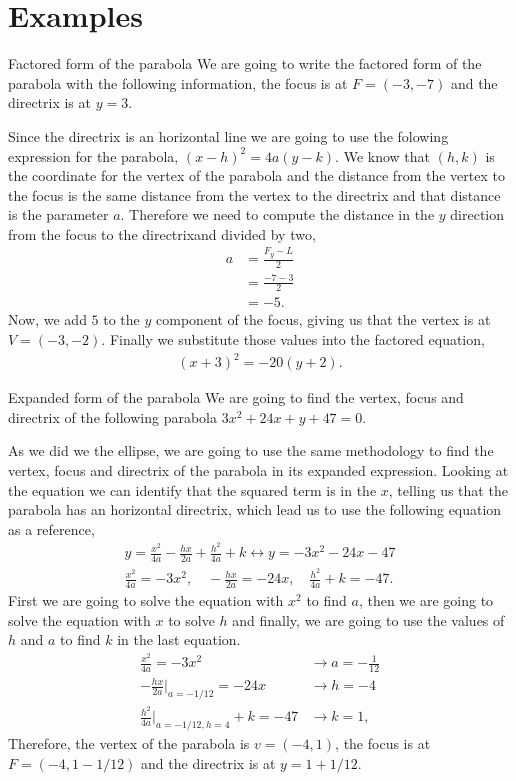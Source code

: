 \documentclass[../main-exe.tex]{subfiles}
\begin{document}
\section{Examples}

\begin{example}{Factored form of the parabola}{}
We are going to write the factored form of the parabola with the following information, the focus is at $F=(-3,-7)$ and the directrix is at $y=3$.

Since the directrix is an horizontal line we are going to use the folowing expression for the parabola, $(x-h)^2=4a(y-k)$.
We know that $(h,k)$ is the coordinate for the vertex of the parabola and the distance from the vertex to the focus is the same distance from the vertex to the directrix and that distance is the parameter $a$.
Therefore we need to compute the distance in the $y$ direction from the focus to the directrixand divided by two,
\begin{align*}
    a &= \frac{F_y - L}{2} \\
      &= \frac{-7-3}{2} \\
      &= -5.
\end{align*}
Now, we add $5$ to the $y$ component of the focus, giving us that the vertex is at $V=(-3,-2)$.
Finally we substitute those values into the factored equation,
\begin{gather*}
    (x+3)^2=-20(y+2).
\end{gather*}

\end{example}

\begin{example}{Expanded form of the parabola}{}
We are going to find the vertex, focus and directrix of the following parabola $3x^2+24x+y+47=0$.

As we did we the ellipse, we are going to use the same methodology to find the vertex, focus and directrix of the parabola in its expanded expression.
Looking at the equation we can identify that the squared term is in the $x$, telling us that the parabola has an horizontal directrix, which lead us to use the following equation as a reference,
\begin{gather*}
    y =\frac{x^2}{4a} -\frac{hx}{2a} +\frac{h^2}{4a} + k
    \longleftrightarrow
    y=-3x^2-24x-47 \\
    \frac{x^2}{4a} = -3x^2,\quad  -\frac{hx}{2a}=-24x,\quad \frac{h^2}{4a} + k = -47.
\end{gather*}
First we are going to solve the equation with $x^2$ to find $a$, then we are going to solve the equation with $x$ to solve $h$ and finally, we are going to use the values of $h$ and $a$ to find $k$ in the last equation.
\begin{align*}
    \frac{x^2}{4a} = -3x^2 &\rightarrow a = -\frac{1}{12} \\
    -\frac{hx}{2a}\Big|_{a=-1/12}=-24x &\rightarrow h = -4 \\
    \frac{h^2}{4a}\Big|_{a=-1/12,h=4} + k = -47 &\rightarrow k = 1,
\end{align*}
Therefore, the vertex of the parabola is $v=(-4,1)$, the focus is at $F=(-4,1-1/12)$ and the directrix is at $y=1+1/12$.

\end{example}
\end{document}
